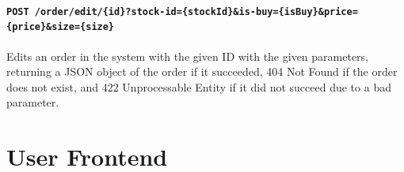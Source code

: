 \documentclass{article}
\begin{document}
\paragraph{\texttt{POST /order/edit/\{id\}?stock-id=\{stockId\}\&is-buy=\{isBuy\}\&price=\{price\}\&size=\{size\}}} Edits an order in the system with the given ID with the given parameters, returning a JSON object of the order if it succeeded, 404 Not Found if the order does not exist, and 422 Unprocessable Entity if it did not succeed due to a bad parameter.

\section{User Frontend}
\end{document}
